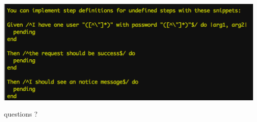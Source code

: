 \documentclass{beamer}
\begin{document}
\begin{frame}
  \begin{center}
    \includegraphics[scale=.5]{step_missing}
  \end{center}
\end{frame}


\begin{frame}
    \begin{center}
    \Huge{}
    questions ?
    \end{center}
\end{frame}
\end{document}

